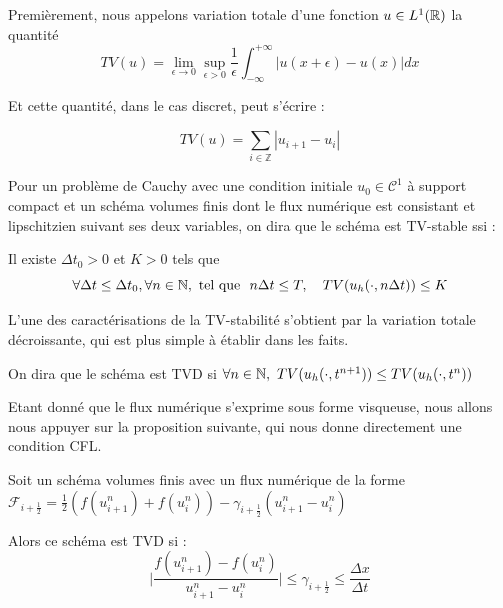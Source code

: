 Premièrement, nous appelons variation totale d'une fonction $u \in L^1(\mathbb{R})$ la quantité 
$$TV(u) = \underset{\epsilon \rightarrow 0}{\lim} \underset{\epsilon > 0}{\sup} \frac{1}{\epsilon} \int_{-\infty}^{+\infty} |u(x + \epsilon) - u(x)| dx$$

Et cette quantité, dans le cas discret, peut s'écrire :

$$TV(u) = \sum_{i \in \mathbb{Z}} |u_{i+1} - u_i| $$
\begin{definitionbox}
\begin{definition}
    Pour un problème de Cauchy avec une condition initiale $u_0 \in \mathcal{C}^1$ à support compact et un schéma volumes finis dont le flux numérique est consistant et lipschitzien suivant ses deux variables, on dira que le schéma est TV-stable ssi :

    \vspace{1em}

    Il existe $\Delta t_0 > 0$ et $K > 0$ tels que
    $$\forall \Delta t \leq \Delta t_0, \forall n \in \mathbb{N}, \text{ tel que } \text{ } n\Delta t \leq T, \quad TV(u_h(\cdot,n\Delta t)) \leq K$$
\end{definition}
\end{definitionbox}

L'une des caractérisations de la TV-stabilité s'obtient par la variation totale décroissante, qui est plus simple à établir dans les faits.

On dira que le schéma est TVD si $\forall n\in \mathbb{N}, \text{ } TV(u_h(\cdot,t^{n+1})) \leq TV(u_h(\cdot,t^n))$

Etant donné que le flux numérique s'exprime sous forme visqueuse, nous allons nous appuyer sur la proposition suivante, qui nous donne directement une condition CFL.

\begin{propositionbox}
\begin{proposition}
    Soit un schéma volumes finis avec un flux numérique de la forme $\mathcal{F}_{i+\frac{1}{2}} = \frac{1}{2}(f(u_{i+1}^n) + f(u_i^n)) - \gamma_{i+\frac{1}{2}}(u_{i+1}^n - u_i^n)$

    \vspace{1em}
    
    Alors ce schéma est TVD si :
    $$\Bigg| \frac{f(u_{i+1}^n) - f(u_i^n)}{u_{i+1}^n - u_i^n} \Bigg| \leq \gamma_{i+\frac{1}{2}} \leq \frac{\Delta x}{\Delta t}$$
\end{proposition}
\end{propositionbox}

